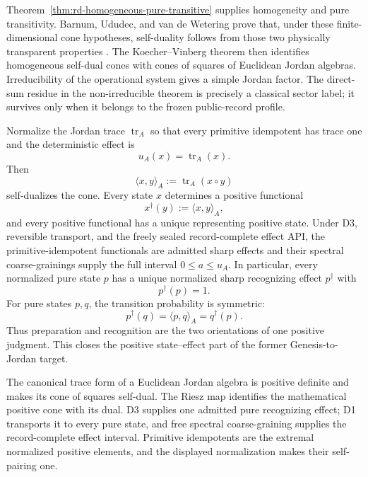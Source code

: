 \begin{proofsketch}
Theorem~\ref{thm:rd-homogeneous-pure-transitive} supplies homogeneity and pure
transitivity.  Barnum, Ududec, and van de Wetering prove that, under these
finite-dimensional cone hypotheses, self-duality follows from those two physically
transparent properties \cite{barnum-ududec-wetering}.  The Koecher--Vinberg theorem
then identifies homogeneous self-dual cones with cones of squares of Euclidean
Jordan algebras.  Irreducibility of the operational system gives a simple Jordan
factor.  The direct-sum residue in the non-irreducible theorem is precisely a
classical sector label; it survives only when it belongs to the frozen public-record
profile.
\end{proofsketch}

\begin{corollary}
\label{cor:rd-positive-dagger}
Normalize the Jordan trace $\operatorname{tr}_A$ so that every primitive idempotent
has trace one and the deterministic effect is
\[
 u_A(x)=\operatorname{tr}_A(x).
\]
Then
\[
 \langle x,y\rangle_A
 :=
 \operatorname{tr}_A(x\circ y)
\]
self-dualizes the cone.  Every state $x$ determines a positive functional
\[
 x^\dagger(y):=\langle x,y\rangle_A,
\]
and every positive functional has a unique representing positive state.  Under D3,
reversible transport, and the freely sealed record-complete effect API, the
primitive-idempotent functionals are admitted sharp effects and their spectral
coarse-grainings supply the full interval $0\le a\le u_A$.  In particular, every normalized pure
state $p$ has a unique normalized sharp recognizing effect $p^\dagger$ with
\[
 p^\dagger(p)=1.
\]
For pure states $p,q$, the transition probability is symmetric:
\[
 p^\dagger(q)
 =
 \langle p,q\rangle_A
 =
 q^\dagger(p).
\]
Thus preparation and recognition are the two orientations of one positive
judgment.  This closes the positive state--effect part of the former
Genesis-to-Jordan target.
\end{corollary}

\begin{proofsketch}
The canonical trace form of a Euclidean Jordan algebra is positive definite and
makes its cone of squares self-dual.  The Riesz map identifies the mathematical
positive cone with its dual.  D3 supplies one admitted pure recognizing effect; D1
transports it to every pure state, and free spectral coarse-graining supplies the
record-complete effect interval.  Primitive idempotents are the extremal normalized
positive elements, and the displayed normalization makes their self-pairing one.
\end{proofsketch}

